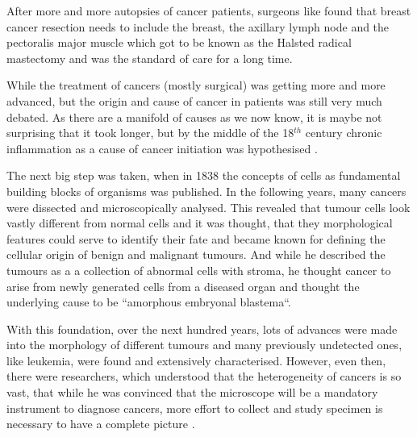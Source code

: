 After more and more autopsies of cancer patients, surgeons like \textcite{Heister1747} found that breast cancer resection needs to include the breast, the axillary lymph node and the pectoralis major muscle which got to be known as the Halsted radical mastectomy and was the standard of care for a long time.

While the treatment of cancers (mostly surgical) was getting more and more advanced, but the origin and cause of cancer in patients was still very much debated. As there are a manifold of causes as we now know, it is maybe not surprising that it took longer, but by  the middle of the 18$^{th}$ century chronic inflammation as a cause of cancer initiation was hypothesised \cite{Hajdu2010b}.

The next big step was taken, when in 1838 the concepts of cells as fundamental building blocks of organisms was published. In the following years, many cancers were dissected and microscopically analysed. This revealed that tumour cells look vastly different from normal cells and it was thought, that they morphological features could serve to identify their fate \cite{Mueller1838} and became known for defining the cellular origin of benign and malignant tumours. And while he described the tumours as a a collection of abnormal cells with stroma, he thought cancer to arise from newly generated cells from a diseased organ and thought the underlying cause to be ``amorphous embryonal blastema``.

With this foundation, over the next hundred years, lots of advances were made into the morphology of different tumours and many previously undetected ones, like leukemia, were found and extensively characterised. However, even then, there were researchers, which understood that the heterogeneity of cancers is so vast, that while he was convinced that the microscope will be a mandatory instrument to diagnose cancers, more effort to collect and study specimen is necessary to have a complete picture \cite{Bennett1849}.


